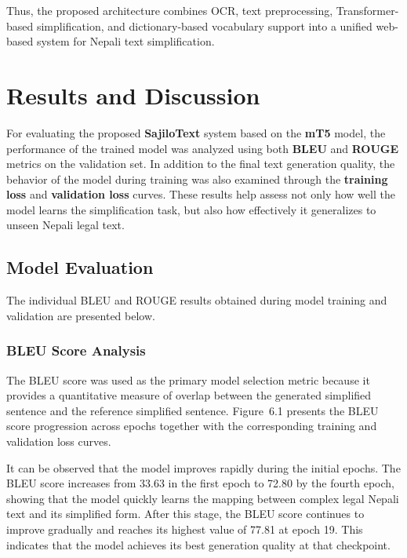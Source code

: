 \documentclass[12pt]{report}
\begin{document}
Thus, the proposed architecture combines OCR, text preprocessing, Transformer-based simplification, and dictionary-based vocabulary support into a unified web-based system for Nepali text simplification.

\chapter{Results and Discussion}


For evaluating the proposed \textbf{SajiloText} system based on the \textbf{mT5} model, the performance of the trained model was analyzed using both \textbf{BLEU} and \textbf{ROUGE} metrics on the validation set. In addition to the final text generation quality, the behavior of the model during training was also examined through the \textbf{training loss} and \textbf{validation loss} curves. These results help assess not only how well the model learns the simplification task, but also how effectively it generalizes to unseen Nepali legal text.

\section{Model Evaluation}

The individual BLEU and ROUGE results obtained during model training and validation are presented below.

\subsection{BLEU Score Analysis}

The BLEU score was used as the primary model selection metric because it provides a quantitative measure of overlap between the generated simplified sentence and the reference simplified sentence. Figure~6.1 presents the BLEU score progression across epochs together with the corresponding training and validation loss curves.

It can be observed that the model improves rapidly during the initial epochs. The BLEU score increases from 33.63 in the first epoch to 72.80 by the fourth epoch, showing that the model quickly learns the mapping between complex legal Nepali text and its simplified form. After this stage, the BLEU score continues to improve gradually and reaches its highest value of 77.81 at epoch 19. This indicates that the model achieves its best generation quality at that checkpoint.
\end{document}
